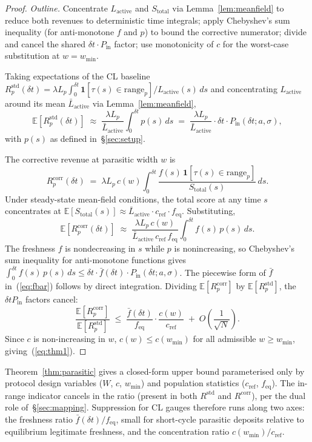 \documentclass[11pt,a4paper]{article}
\theoremstyle{cgdefinition}
\theoremstyle{cgplain}
\theoremstyle{cgremark}
\begin{document}
\begin{proof}
\emph{Outline.} Concentrate $L_{\text{active}}$ and $S_{\text{total}}$ via Lemma~\ref{lem:meanfield} to reduce both revenues to deterministic time integrals; apply Chebyshev's sum inequality (for anti-monotone $f$ and $p$) to bound the corrective numerator; divide and cancel the shared $\delta t \cdot P_{\text{in}}$ factor; use monotonicity of $c$ for the worst-case substitution at $w = w_{\min}$.

Taking expectations of the CL baseline $R^{\text{std}}_p(\delta t) = \lambda L_p \int_0^{\delta t} \mathbf{1}[\tau(s) \in \text{range}_p] / L_{\text{active}}(s)\,ds$ and concentrating $L_{\text{active}}$ around its mean $\bar L_{\text{active}}$ via Lemma~\ref{lem:meanfield},
\[
\mathbb{E}[R^{\text{std}}_p(\delta t)] \;\approx\; \frac{\lambda L_p}{\bar L_{\text{active}}} \int_0^{\delta t} p(s)\,ds \;=\; \frac{\lambda L_p}{\bar L_{\text{active}}} \cdot \delta t \cdot P_{\text{in}}(\delta t; a, \sigma),
\]
with $p(s)$ as defined in~\S\ref{sec:setup}.

The corrective revenue at parasitic width $w$ is
\[
R^{\text{corr}}_p(\delta t) \;=\; \lambda L_p\, c(w) \int_0^{\delta t} \frac{f(s)\,\mathbf{1}[\tau(s) \in \text{range}_p]}{S_{\text{total}}(s)}\,ds.
\]
Under steady-state mean-field conditions, the total score at any time $s$ concentrates at $\mathbb{E}[S_{\text{total}}(s)] \approx \bar L_{\text{active}} \cdot c_{\text{ref}} \cdot f_{\text{eq}}$. Substituting,
\[
\mathbb{E}[R^{\text{corr}}_p(\delta t)] \;\approx\; \frac{\lambda L_p\, c(w)}{\bar L_{\text{active}}\, c_{\text{ref}}\, f_{\text{eq}}} \int_0^{\delta t} f(s)\,p(s)\,ds.
\]
The freshness $f$ is nondecreasing in $s$ while $p$ is nonincreasing, so Chebyshev's sum inequality for anti-monotone functions gives $\int_0^{\delta t} f(s)\,p(s)\,ds \leq \delta t \cdot \bar f(\delta t) \cdot P_{\text{in}}(\delta t; a, \sigma)$. The piecewise form of $\bar f$ in~(\ref{eq:fbar}) follows by direct integration. Dividing $\mathbb{E}[R^{\text{corr}}_p]$ by $\mathbb{E}[R^{\text{std}}_p]$, the $\delta t P_{\text{in}}$ factors cancel:
\[
\frac{\mathbb{E}[R^{\text{corr}}_p]}{\mathbb{E}[R^{\text{std}}_p]} \;\leq\; \frac{\bar f(\delta t)}{f_{\text{eq}}} \cdot \frac{c(w)}{c_{\text{ref}}} \;+\; O\!\left(\frac{1}{\sqrt{N}}\right).
\]
Since $c$ is non-increasing in $w$, $c(w) \leq c(w_{\min})$ for all admissible $w \geq w_{\min}$, giving~(\ref{eq:thm1}).
\end{proof}

Theorem~\ref{thm:parasitic} gives a closed-form upper bound parameterised only by protocol design variables ($W$, $c$, $w_{\min}$) and population statistics ($c_{\text{ref}}$, $f_{\text{eq}}$). The in-range indicator cancels in the ratio (present in both $R^{\text{std}}$ and $R^{\text{corr}}$), per the dual role of~\S\ref{sec:mapping}. Suppression for CL gauges therefore runs along two axes: the freshness ratio $\bar f(\delta t)/f_{\text{eq}}$, small for short-cycle parasitic deposits relative to equilibrium legitimate freshness, and the concentration ratio $c(w_{\min})/c_{\text{ref}}$.
\end{document}
